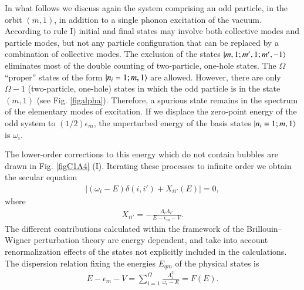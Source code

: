 In what follows we discuss again the system comprising an odd particle, in the orbit $(m, 1)$, in addition to a single phonon excitation of the vacuum. 
According to rule I) initial and final states may involve both collective modes and particle modes, but not any particle configuration that can be replaced by a combination of collective modes. The exclusion of the states $|{m,1; m',1;m',-1} \rangle$ eliminates most of the double counting of two-particle, one-hole states. The $\Omega$ ``proper'' states of the form $|{n_i=1;m,1} \rangle$ are allowed. However, 
there are only $\Omega-1$ (two-particle, one-hole) states in which the odd particle is in the state $(m, 1)$ (see Fig. \ref{figalpha}). Therefore, a spurious state remains in the spectrum of the elementary modes of excitation. If we displace the zero-point energy of the odd system to $(1/2)\epsilon_m$, the unperturbed energy of the basis states $|{n_i=1;m,1} \rangle$ is $\omega_i$.


The lower-order corrections to this energy which do not contain bubbles 
are drawn in Fig. \ref{figC1A4} (I). Iterating these processes to infinite order we obtain the secular equation 
  \begin{align}\label{eqC1A56} 
\left|(\omega_i-E)\delta(i,i')+X_{ii'}(E)\right|=0,
  \end{align}   
  where
    \begin{align}\label{eqC1A57} 
   X_{ii'}=-\frac{\Lambda_i\Lambda_{i'}}{E-\epsilon_m-V}.
    \end{align} 
The different contributions calculated within the framework of the Brillouin--Wigner perturbation theory are energy dependent, and take into account renormalization effects of the states not explicitly included in the calculations. The dispersion relation fixing the energies $E_{qm}$ of the physical states is
  \begin{align}\label{eqC1A60} 
 E-\epsilon_m-V=\sum_{i=1}^{\Omega}\frac{\Lambda_i^2}{\omega_i-E}=F(E).
  \end{align} 


